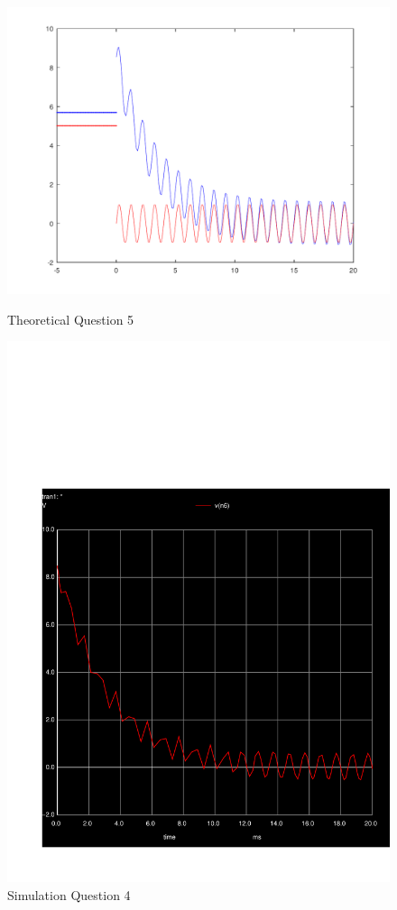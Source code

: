 \begin{figure}[H]
      \includegraphics[width=\linewidth]{../mat/alinea5.pdf}
      \caption{Theoretical Question 5}
    \endminipage\hfill
      \includegraphics[width=\linewidth]{../sim/transient4r.pdf}
      \caption{Simulation Question 4}
    \endminipage\hfill
\end{figure}

